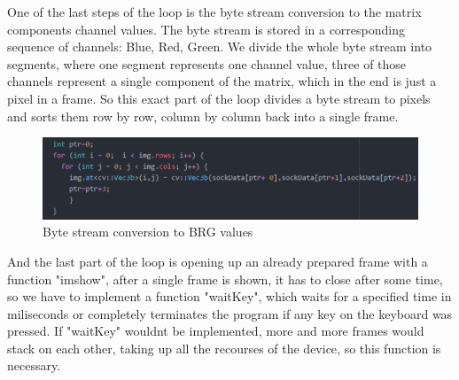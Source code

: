 \documentclass[conference]{IEEEtran}
\begin{document}
\newline
One of the last steps of the loop is the byte stream conversion to the matrix components channel values. The byte stream is stored in a corresponding sequence of channels: Blue, Red, Green. We divide the whole byte stream into segments, where one segment represents one channel value, three of those channels represent a single component of the matrix, which in the end is just a pixel in a frame. So this exact part of the loop divides a byte stream to pixels and sorts them row by row, column by column back into a single frame.
\begin{figure}[h!]
	\includegraphics[width=\linewidth]{ServerCodeExample3.png}
	\caption{Byte stream conversion to BRG values}
	\label{fig:SCE3}
\end{figure}
\newline
And the last part of the loop is opening up an already prepared frame with a function "imshow", after a single frame is shown, it has to close after some time, so we have to implement a function "waitKey", which waits for a specified time in miliseconds or completely terminates the program if any key on the keyboard was pressed. If "waitKey" wouldnt be implemented, more and more frames would stack on each other, taking up all the recourses of the device, so this function is necessary.
\end{document}
